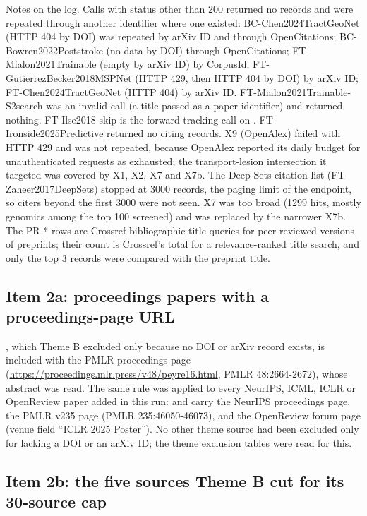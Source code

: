 \documentclass[journal,onecolumn]{IEEEtran}
\begin{document}
Notes on the log. Calls with status other than 200 returned no records and were repeated through another identifier where one existed: BC-Chen2024TractGeoNet (HTTP 404 by DOI) was repeated by arXiv ID and through OpenCitations; BC-Bowren2022Poststroke (no data by DOI) through OpenCitations; FT-Mialon2021Trainable (empty by arXiv ID) by CorpusId; FT-GutierrezBecker2018MSPNet (HTTP 429, then HTTP 404 by DOI) by arXiv ID; FT-Chen2024TractGeoNet (HTTP 404) by arXiv ID. FT-Mialon2021Trainable-S2search was an invalid call (a title passed as a paper identifier) and returned nothing. FT-Ilse2018-skip is the forward-tracking call on \cite{Ilse2018AttentionMIL}. FT-Ironside2025Predictive returned no citing records. X9 (OpenAlex) failed with HTTP 429 and was not repeated, because OpenAlex reported its daily budget for unauthenticated requests as exhausted; the transport-lesion intersection it targeted was covered by X1, X2, X7 and X7b. The Deep Sets citation list (FT-Zaheer2017DeepSets) stopped at 3000 records, the paging limit of the endpoint, so citers beyond the first 3000 were not seen. X7 was too broad (1299 hits, mostly genomics among the top 100 screened) and was replaced by the narrower X7b. The PR-* rows are Crossref bibliographic title queries for peer-reviewed versions of preprints; their count is Crossref's total for a relevance-ranked title search, and only the top 3 records were compared with the preprint title.

\subsection{Item 2a: proceedings papers with a proceedings-page URL}

\cite{Peyre2016Gromov}, which Theme B excluded only because no DOI or arXiv record exists, is included with the PMLR proceedings page (\url{https://proceedings.mlr.press/v48/peyre16.html}, PMLR 48:2664-2672), whose abstract was read. The same rule was applied to every NeurIPS, ICML, ICLR or OpenReview paper added in this run: \cite{Luise2018Differential} and \cite{Togninalli2019Wasserstein} carry the NeurIPS proceedings page, \cite{Song2024Multimodal} the PMLR v235 page (PMLR 235:46050-46073), and \cite{Bai2025Linear} the OpenReview forum page (venue field ``ICLR 2025 Poster''). No other theme source had been excluded only for lacking a DOI or an arXiv ID; the theme exclusion tables were read for this.

\subsection{Item 2b: the five sources Theme B cut for its 30-source cap}
\end{document}
